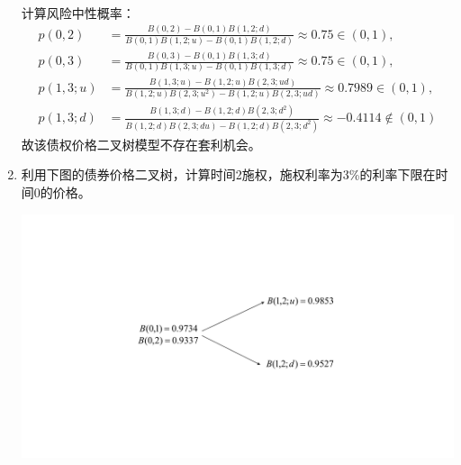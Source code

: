 \begin{enumerate}
\begin{center}
    \end{center}
    \sol\\
    计算风险中性概率：
    \begin{align*}
        p(0, 2) & = \frac{B(0,2)-B(0,1)B(1,2;d)}{B(0,1)B(1,2;u)-B(0,1)B(1,2;d)} \approx 0.75 \in (0,1),\\
        p(0, 3) & = \frac{B(0,3)-B(0,1)B(1,3;d)}{B(0,1)B(1,3;u)-B(0,1)B(1,3;d)} \approx 0.75 \in (0,1),\\
        p(1,3;u) & = \frac{B(1,3;u)-B(1,2;u)B(2,3;ud)}{B(1,2;u)B(2,3;u^2)-B(1,2;u)B(2,3;ud)} \approx 0.7989 \in (0,1),\\
        p(1,3;d) & = \frac{B(1,3;d)-B(1,2;d)B(2,3;d^2)}{B(1,2;d)B(2,3;du)-B(1,2;d)B(2,3;d^2)} \approx -0.4114 \notin (0,1)
    \end{align*}
    故该债权价格二叉树模型不存在套利机会。%
    \item 利用下图的债券价格二叉树，计算时间2施权，施权利率为3\%的利率下限在时间0的价格。
    \begin{center}
        \includegraphics[scale=0.5]{8-8.pdf}

\end{center}
\end{enumerate}
